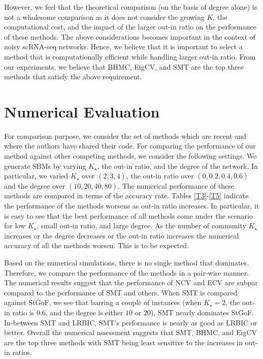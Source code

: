 \documentclass[11pt]{article}
\begin{document}
However, we feel that the theoretical comparison (on the basis of degree alone) is not a wholesome comparison as it does not consider the growing $K$, the computational cost, and the impact of the larger out-in ratio on the performance of these methods. The above considerations becomes important in the context of noisy scRNA-seq networks. Hence, we believe that it is important to select a method that is computationally efficient while handling larger out-in ratio. From our experiments, we believe that BHMC, EigCV, and SMT are the top three methods that satisfy the above requirement.

\section{Numerical Evaluation}\label{evaluation}
For comparison purpose, we consider the set of methods which are recent and where the authors have shared their code. For comparing the performance of our method against other competing methods, we consider the following settings. We generate SBMs by varying $K_{\star}$, the out-in ratio, and the degree of the network. In particular, we varied $K_{\star}$ over $(2,3,4)$, the out-in ratio over $(0, 0.2, 0.4, 0.6)$ and the degree over $(10, 20, 40, 80)$. The numerical performance of these methods are compared in terms of the accuracy rate. Tables \ref{T3}-\ref{T5} indicate the performance of the methods worsens as out-in ratio increases. In particular, it is easy to see that the best performance of all methods come under the scenario for low $K_{\star}$, small out-in ratio, and large degree.
As the number of community $K_{\star}$ increases or the degree decreases or the out-in ratio increases the numerical accuracy of all the methods worsen. This is to be expected.

Based on the numerical simulations, there is no single method that dominates. Therefore, we compare the performance of the methods in a pair-wise manner. The numerical results suggest that the performance of NCV and ECV are subpar compared to the performance of SMT and others. When SMT is compared against StGoF, we see that barring a couple of instances (when $K_{\star}= 2$, the out-in ratio is $0.6$, and the degree is either $10$ or $20$), SMT nearly dominates StGoF. In-between SMT and LRBIC, SMT's performance is nearly as good as LRBIC or better. Overall the numerical assessment suggests that SMT, BHMC, and EigCV are the top three methods with SMT being least sensitive to the increases in out-in ratios. 
\end{document}
